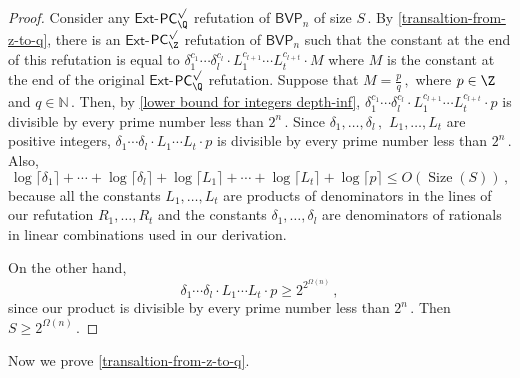 \documentclass{toc}
\DeclareMathOperator{\Size}{\mathrm{Size}}   %
\begin{document}
\begin{proof}
Consider any $\mathsf{Ext}$-$\mathsf{PC}^{\surd}_{\Q}$ refutation of $\mathsf{BVP}_n$ of size %
$S\,.$ %
 By \autoref{transaltion-from-z-to-q}, there is an $\mathsf{Ext}$-$\mathsf{PC}^{\surd}_{\Z}$ refutation of $\mathsf{BVP}_n$ such that the constant at %
the end of this refutation is equal to $\delta_1^{c_{1}} \cdots \delta_l^{c_{l}} \cdot  L_1^{c_{l + 1}} \cdots L_t^{c_{l + t}}  \cdot M$ where $M$ is the constant at %
the end of the original $\mathsf{Ext}$-$\mathsf{PC}^{\surd}_{\Q}$ refutation. Suppose that %
$M = \frac{p}{q}\,,$ %
 where $p \in \Z$ and %
$q \in \mathbb{N}\,.$ %
 Then, by \autoref{lower bound for integers depth-inf}, $\delta_1^{c_{1}} \cdots \delta_l^{c_{l}} \cdot  L_1^{c_{l + 1}} \cdots L_t^{c_{l + t}}  \cdot p$ is divisible by every prime number less than %
$2^n\,.$ %
 Since %
$\delta_1, \ldots, \delta_l\,,$ %
 $L_1, \ldots, L_t$ are positive integers,
$
\delta_1 \cdots \delta_l \cdot  L_1 \cdots L_t  \cdot p
$
is divisible by every prime number less than %
$2^n\,.$ %
 Also,
$$
%
\log \lceil \delta_1 \rceil + \cdots + \log \lceil \delta_l \rceil + \log \lceil L_1 \rceil  + \cdots +  \log \lceil L_t \rceil + \log \lceil p \rceil \le O(\Size(S))\,, %
$$ 
because all the constants $L_1, \ldots, L_t$ are products of denominators in the lines of our refutation %
$R_1, \ldots, R_t$ %
 and the constants $\delta_1, \ldots, \delta_l$ are denominators of rationals in linear combinations used in our derivation.

On the other hand,  
$$
%
\delta_1 \cdots \delta_l \cdot  L_1 \cdots L_t  \cdot p \ge 2^{2^{\Omega(n)}}\,, %
$$
since our product is divisible by every prime number less than %
$2^n\,.$ %
 Then %
$S \ge 2^{\Omega(n)}\,.$ %
\end{proof}

Now we prove \autoref{transaltion-from-z-to-q}. 
\end{document}
